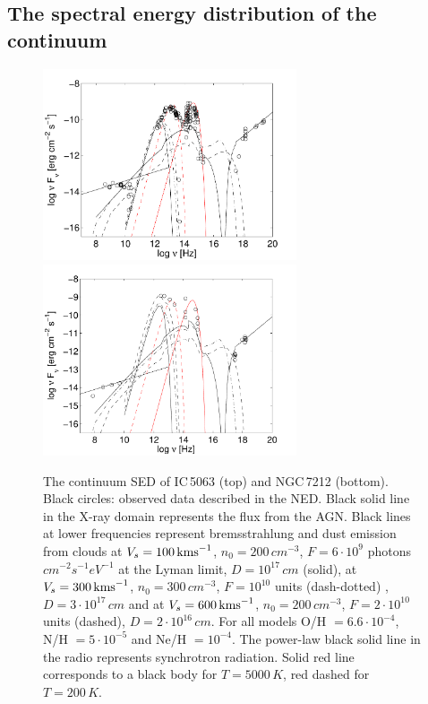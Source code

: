 \documentclass[../main.tex]{subfiles}
\begin{document}
\subsection{The spectral energy distribution of the continuum}

\begin{figure}
\includegraphics[width=7.5cm]{images/paper1/sedic50.pdf}
\includegraphics[width=7.5cm]{images/paper1/sedn72.pdf}
\caption{The continuum SED of IC\,5063 (top) and NGC\,7212 (bottom).
Black circles: observed data described in the NED.
Black solid line in the X-ray domain represents the flux from the AGN.
Black lines at lower frequencies represent bremsstrahlung and dust emission from clouds at $V_s=100\,\si{\kms}$, $n_0=200\,\si{cm^{-3}}$, $F=6 \cdot 10^9$ photons $\si{cm^{-2} s^{-1} eV^{-1}}$ at the Lyman limit, $ D=10^{17}\,\si{cm}$ (solid), at $V_s=300\,\si{\kms}$, $n_0=300 \,\si{cm^{-3}}$, $F= 10^{10}$ units (dash-dotted) , $ D=3\cdot10^{17}\,\si{ cm}$ and at $V_s= 600\,\si{\kms}$,  $n_0=200\,\si{cm^{-3}}$, $F=2\cdot10^{10}$  units (dashed), $ D=2\cdot10^{16}\,\si{ cm}$. 
For all models O/H $=6.6\cdot10^{-4}$, N/H $= 5\cdot10^{-5}$ and Ne/H $= 10^{-4}$.
The power-law black solid line in the radio represents synchrotron radiation.
Solid red line corresponds to a black body for $T=5000\,\si{K}$, red dashed for $T=200\,\si{K}$.}
\label{fig:SED}
\end{figure}
\end{document}
